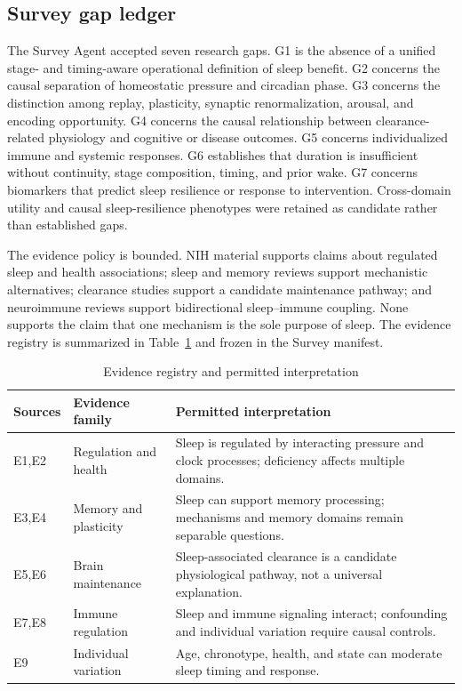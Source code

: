 \documentclass[conference]{IEEEtran}
\begin{document}
\subsection{Survey gap ledger}
The Survey Agent accepted seven research gaps. G1 is the absence of a unified stage- and timing-aware operational definition of sleep benefit. G2 concerns the causal separation of homeostatic pressure and circadian phase. G3 concerns the distinction among replay, plasticity, synaptic renormalization, arousal, and encoding opportunity. G4 concerns the causal relationship between clearance-related physiology and cognitive or disease outcomes. G5 concerns individualized immune and systemic responses. G6 establishes that duration is insufficient without continuity, stage composition, timing, and prior wake. G7 concerns biomarkers that predict sleep resilience or response to intervention. Cross-domain utility and causal sleep-resilience phenotypes were retained as candidate rather than established gaps.

The evidence policy is bounded. NIH material supports claims about regulated sleep and health associations; sleep and memory reviews support mechanistic alternatives; clearance studies support a candidate maintenance pathway; and neuroimmune reviews support bidirectional sleep--immune coupling. None supports the claim that one mechanism is the sole purpose of sleep. The evidence registry is summarized in Table~\ref{tab:evidence} and frozen in the Survey manifest.

\begin{table}[t]
\caption{Evidence registry and permitted interpretation}
\label{tab:evidence}
\centering
\footnotesize
\setlength{\tabcolsep}{2pt}
\begin{tabular}{p{}p{}p{}}
\toprule
Sources & Evidence family & Permitted interpretation \\
\midrule
E1,E2 & Regulation and health & Sleep is regulated by interacting pressure and clock processes; deficiency affects multiple domains. \\
E3,E4 & Memory and plasticity & Sleep can support memory processing; mechanisms and memory domains remain separable questions. \\
E5,E6 & Brain maintenance & Sleep-associated clearance is a candidate physiological pathway, not a universal explanation. \\
E7,E8 & Immune regulation & Sleep and immune signaling interact; confounding and individual variation require causal controls. \\
E9 & Individual variation & Age, chronotype, health, and state can moderate sleep timing and response. \\
\bottomrule
\end{tabular}
\end{table}
\end{document}
